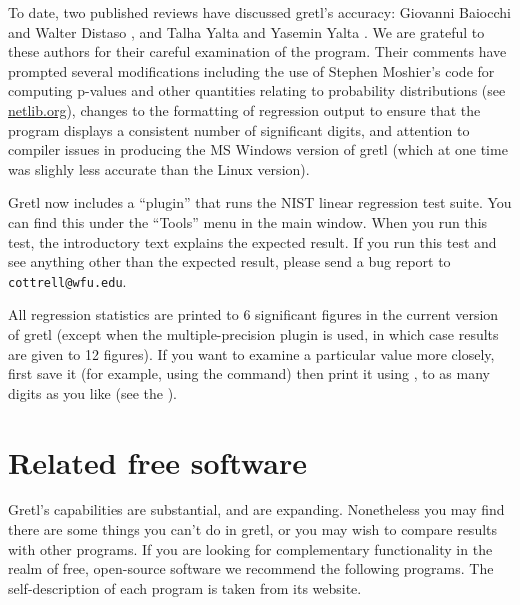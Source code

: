 To date, two published reviews have discussed gretl's accuracy:
Giovanni Baiocchi and Walter Distaso \citeyearpar{baiocchi03}, and
Talha Yalta and Yasemin Yalta \citeyearpar{yalta07}.  We are grateful
to these authors for their careful examination of the program.  Their
comments have prompted several modifications including the use of
Stephen Moshier's  code for computing p-values and other
quantities relating to probability distributions (see
\href{http://www.netlib.org/cephes/}{netlib.org}), changes to the
formatting of regression output to ensure that the program displays a
consistent number of significant digits, and attention to compiler
issues in producing the MS Windows version of gretl (which at
one time was slighly less accurate than the Linux version).

Gretl now includes a ``plugin'' that runs the NIST linear
regression test suite.  You can find this under the ``Tools'' menu in
the main window.  When you run this test, the introductory text
explains the expected result.  If you run this test and see anything
other than the expected result, please send a bug report to
\verb+cottrell@wfu.edu+.

All regression statistics are printed to 6 significant figures in the
current version of gretl (except when the multiple-precision
plugin is used, in which case results are given to 12 figures).  If
you want to examine a particular value more closely, first save it
(for example, using the  command) then print it using
, to as many digits as you like (see the \GCR).  

\chapter{Related free software}
\label{app-advanced}

Gretl's capabilities are substantial, and are expanding.
Nonetheless you may find there are some things you can't do in
gretl, or you may wish to compare results with other programs.
If you are looking for complementary functionality in the realm of
free, open-source software we recommend the following programs.  The
self-description of each program is taken from its website.

